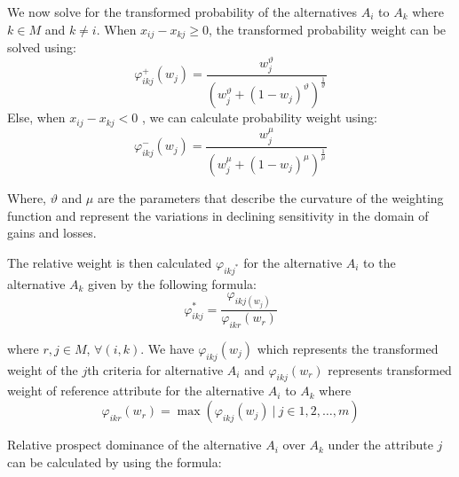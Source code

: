 \documentclass{infor}
\theoremstyle{remark}
\begin{document}
\begin{steps}

\item We now solve for the transformed probability of the alternatives \(A_{i}\) to \(A_{k}\) where \(k \in M\) and \(k \neq i\). When \(x_{ij} - x_{kj} \geq 0\), the transformed probability weight can be solved using:
\begin{equation}\label{eqn:phiPlusIKJ}
\varphi_{ikj}^{+}\left( w_{j} \right) = \frac{w_{j}^{\vartheta}}{\left( w_{j}^{\vartheta} + \left( 1 - w_{j} \right)^{\vartheta} \right)^{\frac{1}{\vartheta}}}
\end{equation}
Else, when \(x_{ij} - x_{kj} < 0\) , we can calculate probability weight using:
\begin{equation}\label{eqn:phiMinusIKJ}
\varphi_{ikj}^{-}\left( w_{j} \right) = \frac{w_{j}^{\mu}}{\left( w_{j}^{\mu} + \left( 1 - w_{j} \right)^{\mu} \right)^{\frac{1}{\mu}}}
\end{equation}

Where, \(\vartheta\) and \(\mu\) are the
parameters that describe the curvature of the weighting function and
represent the variations in declining sensitivity in the domain of gains
and losses.

The relative weight is then calculated \(\varphi_{ikj^{*}}\) for the alternative \(A_{i}\) to the alternative \(A_{k}\) given by the
following formula:
\begin{equation}\label{eqn:phiRelative}
\varphi_{ikj}^{*} = \frac{\varphi_{ikj(w_{j})}}{\varphi_{ikr}(w_{r})}
\end{equation}

where \(r,j \in M\), \(\forall(i,k)\). We have
\(\varphi_{ikj}(w_{j})\) which represents the transformed weight
of the \(j\)th criteria for alternative \(A_{i}\) and
\(\varphi_{ikj}(w_{r})\) represents transformed weight of
reference attribute for the alternative \(A_{i}\) to \(A_{k}\) where
\begin{equation}\label{eqn:maxPhiWeight}
\varphi_{ikr}\left( w_{r} \right) = \max\left( \varphi_{ikj}\left( w_{j} \right)\ |\ j \in 1,2,\ldots,m \right)
\end{equation}

\item Relative prospect dominance of the alternative \(A_{i}\) over \(A_{k}\) under the attribute \(j\) can be calculated by using the formula:


\end{steps}
\end{document}
